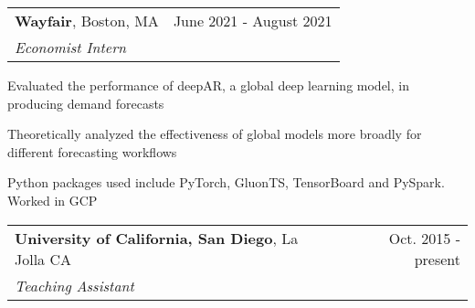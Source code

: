 \documentclass[10pt]{article}
\newcommand{\mysep}{\vspace{4pt}}
\begin{document}
\begin{tabularx}{\textwidth}{LR}
\textbf{Wayfair}, Boston, MA
&
June 2021 - August 2021
\\
\emph{Economist Intern}
\end{tabularx}
\begin{blist}
\item Evaluated the performance of deepAR, a global deep learning model, in producing demand forecasts
\item Theoretically analyzed the effectiveness of global models more broadly for different forecasting workflows
\item Python packages used include PyTorch, GluonTS, TensorBoard and PySpark. Worked in GCP
\end{blist}

\mysep{}
\begin{tabularx}{\textwidth}{LR}
\textbf{University of California, San Diego}, La Jolla CA 
&
Oct. 2015 - present
\\
\emph{Teaching Assistant}
\end{tabularx}
\end{document}
